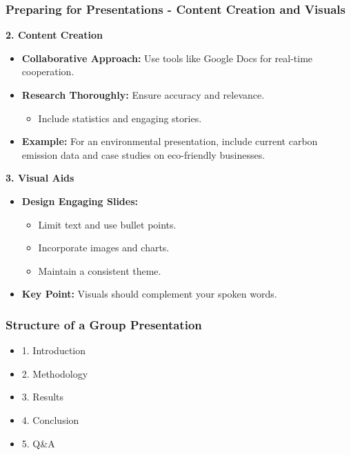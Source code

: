 \documentclass[aspectratio=169]{beamer}
\begin{document}
\begin{frame}[fragile]
    \frametitle{Preparing for Presentations - Content Creation and Visuals}
    \textbf{2. Content Creation}
    \begin{itemize}
        \item \textbf{Collaborative Approach:} Use tools like Google Docs for real-time cooperation.
        \item \textbf{Research Thoroughly:} Ensure accuracy and relevance.
        \begin{itemize}
            \item Include statistics and engaging stories.
        \end{itemize}
        \item \textbf{Example:} For an environmental presentation, include current carbon emission data and case studies on eco-friendly businesses.
    \end{itemize}

    \textbf{3. Visual Aids}
    \begin{itemize}
        \item \textbf{Design Engaging Slides:}
        \begin{itemize}
            \item Limit text and use bullet points.
            \item Incorporate images and charts.
            \item Maintain a consistent theme.
        \end{itemize}
        \item \textbf{Key Point:} Visuals should complement your spoken words.
    \end{itemize}
\end{frame}

\begin{frame}[fragile]
    \frametitle{Structure of a Group Presentation}
    \begin{itemize}
        \item 1. Introduction
        \item 2. Methodology
        \item 3. Results
        \item 4. Conclusion
        \item 5. Q\&A
    \end{itemize}
\end{frame}
\end{document}
